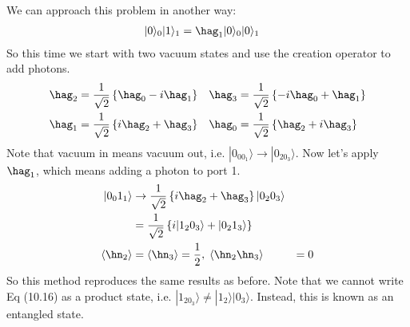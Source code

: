 \documentclass[a4paper, 11pt, normalem]{report}
\begin{document}
We can approach this problem in another way:
\begin{align}
    |0\rangle_0|1\rangle_1 &= \hag_1|0\rangle_0|0\rangle_1
\end{align}
So this time we start with two vacuum states and use the creation operator to add photons. 
\begin{align}
    \hag_2 &= \frac{1}{\sqrt{2}}\left\{\hag_0 - i\hag_1\right\} & \hag_3 &= \frac{1}{\sqrt{2}}\left\{-i\hag_0 + \hag_1\right\} \\
    \hag_1 &= \frac{1}{\sqrt{2}}\left\{i\hag_2+\hag_3\right\} & \hag_0 &= \frac{1}{\sqrt{2}}\left\{\hag_2+i\hag_3\right\}
\end{align}
Note that vacuum in means vacuum out, i.e. $|0_00_1\rangle \to |0_20_3\rangle$.
Now let's apply $\hag_1$, which means adding a photon to port 1. 
\begin{align}
    |0_01_1\rangle &\to \frac{1}{\sqrt{2}}\left\{i\hag_2+\hag_3\right\}|0_20_3\rangle \\
                   &= \frac{1}{\sqrt{2}}\left\{i|1_20_3\rangle + |0_21_3\rangle\right\} \\
    \langle\hn_2\rangle &= \langle\hn_3\rangle = \frac12,\; \langle\hn_2\hn_3\rangle &= 0 
\end{align}
So this method reproduces the same results as before.
Note that we cannot write Eq (10.16) as a product state, i.e. $|1_20_3\rangle \neq |1_2\rangle|0_3\rangle$.
Instead, this is known as an entangled state.
\end{document}
